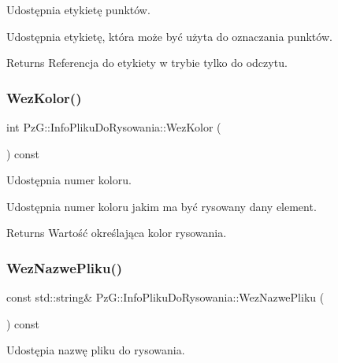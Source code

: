Udostępnia etykietę punktów. 

Udostępnia etykietę, która może być użyta do oznaczania punktów. \begin{DoxyReturn}{Returns}
Referencja do etykiety w trybie tylko do odczytu. 
\end{DoxyReturn}
\mbox{\label{class_pz_g_1_1_info_pliku_do_rysowania_a137081c82c29acd7df02badb27c8a2cf}} 
\subsubsection{\texorpdfstring{WezKolor()}{WezKolor()}}
{\footnotesize\ttfamily int Pz\+G\+::\+Info\+Pliku\+Do\+Rysowania\+::\+Wez\+Kolor (\begin{DoxyParamCaption}{ }\end{DoxyParamCaption}) const\hspace{0.3cm}{\ttfamily [inline]}}



Udostępnia numer koloru. 

Udostępnia numer koloru jakim ma być rysowany dany element. \begin{DoxyReturn}{Returns}
Wartość określająca kolor rysowania. 
\end{DoxyReturn}
\mbox{\label{class_pz_g_1_1_info_pliku_do_rysowania_a714aaa4c8e7bbd167ccbb1e797ca158c}} 
\subsubsection{\texorpdfstring{WezNazwePliku()}{WezNazwePliku()}}
{\footnotesize\ttfamily const std\+::string\& Pz\+G\+::\+Info\+Pliku\+Do\+Rysowania\+::\+Wez\+Nazwe\+Pliku (\begin{DoxyParamCaption}{ }\end{DoxyParamCaption}) const\hspace{0.3cm}{\ttfamily [inline]}}



Udostępia nazwę pliku do rysowania. 

